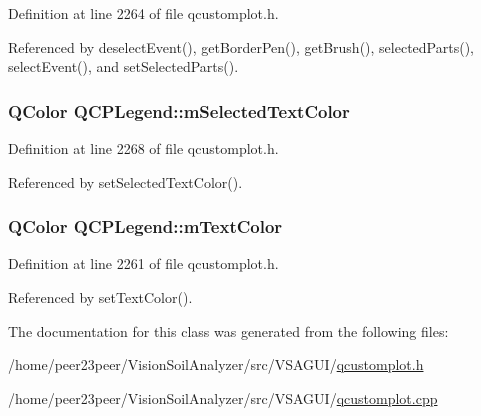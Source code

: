 Definition at line 2264 of file qcustomplot.\+h.



Referenced by deselect\+Event(), get\+Border\+Pen(), get\+Brush(), selected\+Parts(), select\+Event(), and set\+Selected\+Parts().

\hypertarget{class_q_c_p_legend_a6c25c8796c6e73e983aae6024965f2be}{}
\subsubsection[{m\+Selected\+Text\+Color}]{\setlength{\rightskip}{0pt plus 5cm}Q\+Color Q\+C\+P\+Legend\+::m\+Selected\+Text\+Color\hspace{0.3cm}{\ttfamily [protected]}}\label{class_q_c_p_legend_a6c25c8796c6e73e983aae6024965f2be}


Definition at line 2268 of file qcustomplot.\+h.



Referenced by set\+Selected\+Text\+Color().

\hypertarget{class_q_c_p_legend_a478b2d809a7390e9ff8f8bb70d6bd9fe}{}
\subsubsection[{m\+Text\+Color}]{\setlength{\rightskip}{0pt plus 5cm}Q\+Color Q\+C\+P\+Legend\+::m\+Text\+Color\hspace{0.3cm}{\ttfamily [protected]}}\label{class_q_c_p_legend_a478b2d809a7390e9ff8f8bb70d6bd9fe}


Definition at line 2261 of file qcustomplot.\+h.



Referenced by set\+Text\+Color().



The documentation for this class was generated from the following files\+:\begin{DoxyCompactItemize}
\item 
/home/peer23peer/\+Vision\+Soil\+Analyzer/src/\+V\+S\+A\+G\+U\+I/\hyperlink{qcustomplot_8h}{qcustomplot.\+h}\item 
/home/peer23peer/\+Vision\+Soil\+Analyzer/src/\+V\+S\+A\+G\+U\+I/\hyperlink{qcustomplot_8cpp}{qcustomplot.\+cpp}\end{DoxyCompactItemize}
